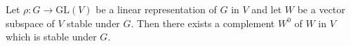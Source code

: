 Let $\rho: G \to \text{GL}(V)$ be a linear representation of $G$ in $V$ and let $W$ be a vector subspace of $V$ stable under $G$. Then there exists a complement $W^0$ of $W$ in $V$ which is stable under $G$.
